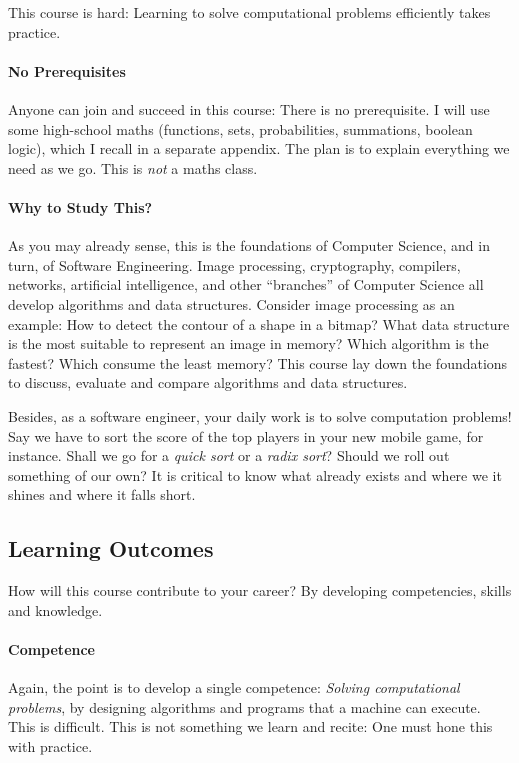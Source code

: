 \documentclass{aldast}
\begin{document}
\begin{takeaway}
  This course is hard: Learning to solve computational problems
  efficiently takes practice.
\end{takeaway}

\paragraph{No Prerequisites} Anyone can join and succeed in this
course: There is no prerequisite. I will use some high-school maths
(functions, sets, probabilities, summations, boolean logic), which I
recall in a separate appendix. The plan is to explain everything we
need as we go. This is \emph{not} a maths class.

\paragraph{Why to Study This?}
As you may already sense, this is the foundations of Computer Science,
and in turn, of Software Engineering. Image processing, cryptography,
compilers, networks, artificial intelligence, and other ``branches''
of Computer Science all develop algorithms and data
structures. Consider image processing as an example: How to detect the
contour of a shape in a bitmap?  What data structure is the most
suitable to represent an image in memory? Which algorithm is the
fastest? Which consume the least memory? This course lay down the
foundations to discuss, evaluate and compare algorithms and data
structures.

Besides, as a software engineer, your daily work is to solve
computation problems! Say we have to sort the score of the top players
in your new mobile game, for instance. Shall we go for a \emph{quick
  sort} or a \emph{radix sort}?  Should we roll out something of our
own? It is critical to know what already exists and where we it shines
and where it falls short.


\subsection{Learning Outcomes}

How will this course contribute to your career? By
developing competencies, skills and knowledge.

\paragraph{Competence}
Again, the point is to develop a single competence: \emph{Solving
  computational problems}, by designing algorithms and programs that a
machine can execute. This is difficult. This is not something we learn
and recite: One must hone this with practice.
\end{document}
